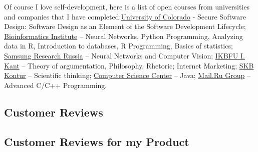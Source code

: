 \documentclass{yb}
\begin{document}
\begin{samepage}
Of course I love self-development, here is a list of open courses from universities and companies that I have completed:\newline \href{https://www.colorado.edu/}{University of Colorado} - Secure Software Design: Software Design as an Element of the Software Development Lifecycle; \href{https://bioinf.me/en}{Bioinformatics Institute} -- Neural Networks, Python Programming, Analyzing data in R, Introduction to databases, R Programming, Basics of statistics; \href{https://research.samsung.com/srr}{Samsung Research Russia} -- Neural Networks and Computer Vision; \href{https://eng.kantiana.ru/}{IKBFU I. Kant} -- Theory of argumentation, Philosophy, Rhetoric; Internet Marketing; \href{https://kontur.ru/}{SKB Kontur} -- Scientific thinking; \href{https://compscicenter.ru/}{Computer Science Center} -- Java; \href{https://en.wikipedia.org/wiki/VK_(company)}{Mail.Ru Group} -- Advanced C/C++ Programming.

\end{samepage}


\subsection*{Customer Reviews}





\subsection*{Customer Reviews for my Product}



\end{document}
